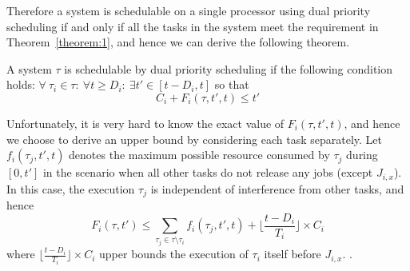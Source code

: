 Therefore a system  is schedulable on a single processor using dual priority scheduling  if and only if all the tasks in the system meet the requirement in Theorem~\ref{theorem:1}, and hence we can  derive the following theorem.
\begin{theorem}
A system $\tau$ is schedulable by dual priority scheduling if the following condition holds: $\forall~\tau_i\in \tau:~\forall t\geq D_i:~\exists t'\in[t-D_i,t]$ so that 
\[
C_i+F_i(\tau,t',t)\leq t'
\]
\end{theorem}




Unfortunately, it is very hard to know the exact value of $F_i(\tau,t',t)$, and hence we choose to derive an upper bound by considering  each task separately. Let  $f_i(\tau_j,t',t)$ denotes the maximum possible resource consumed by $\tau_j$ during $[0,t']$ in the scenario when all  other tasks  do not release any jobs (except $J_{i,x}$). In this case, the execution $\tau_j$ is independent of interference from other tasks, and hence
\[
F_i(\tau,t')\leq 	 \sum_{\tau_j\in\tau\setminus \tau_i} f_i(\tau_j,t',t)+\lfloor \frac{t-D_i}{T_i} \rfloor \times C_i
\]
where $\lfloor \frac{t-D_i}{T_i} \rfloor \times C_i$ upper bounds the execution of $\tau_i$ itself before $J_{i,x}$.
.






